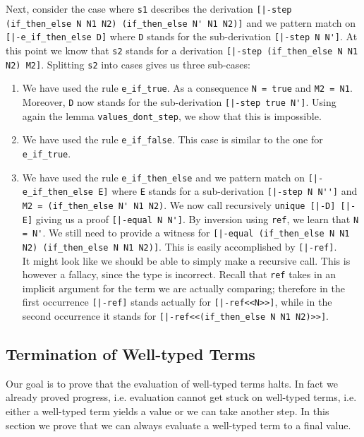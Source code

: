 Next, consider the case where \lstinline!s1! describes the derivation
\lstinline![|-step (if_then_else N N1 N2) (if_then_else N' N1 N2)]! and we pattern match on
\lstinline![|-e_if_then_else D]! where \lstinline!D! stands for the sub-derivation 
\lstinline![|-step N N']!. At this point we know that \lstinline!s2! stands
for a derivation \lstinline![|-step (if_then_else N N1 N2) M2]!. Splitting
\lstinline!s2! into cases gives us three sub-cases: 

\begin{enumerate}
\item We have used the rule \lstinline!e_if_true!. As a consequence
  \lstinline!N = true! and \lstinline!M2 = N1!. Moreover,  
  \lstinline!D! now stands for the sub-derivation \lstinline![|-step true N']!. 
  Using again the lemma \lstinline!values_dont_step!, we show that this is impossible.
\item We have used the rule \lstinline!e_if_false!. This case is similar to
  the one for \lstinline!e_if_true!.
\item We have used the rule \lstinline!e_if_then_else! and we pattern match on 
\lstinline![|-e_if_then_else E]! where \lstinline!E! stands for a sub-derivation
\lstinline![|-step N N'']! and \lstinline!M2 = (if_then_else N' N1 N2)!.
We now call recursively \lstinline!unique [|-D] [|-E]! giving us a proof 
\lstinline![|-equal N N']!. By inversion using \lstinline!ref!, we learn that
\lstinline!N = N'!. We still need to provide a witness for 
\lstinline![|-equal (if_then_else N N1 N2) (if_then_else N N1 N2)]!. This is easily
accomplished by \lstinline![|-ref]!. \\[0.5em]
It might look like we should be able to simply make a recursive call. This is
however a fallacy, since the type is incorrect. Recall that \lstinline!ref!
takes in an implicit argument for the term we are actually comparing; therefore
in the first occurrence \lstinline![|-ref]! stands actually for
\lstinline![|-ref<<N>>]!, while in the second occurrence it %
stands for \lstinline![|-ref<<(if_then_else N N1 N2)>>]!.
\end{enumerate}


\subsection{Termination of Well-typed Terms}
Our goal is to prove that the evaluation of well-typed terms halts. In
fact we already proved progress, i.e. evaluation cannot get stuck on
well-typed terms, i.e. either a well-typed term yields a value or we
can take another step. In this section we prove that we can always
evaluate a well-typed term to a final value.

